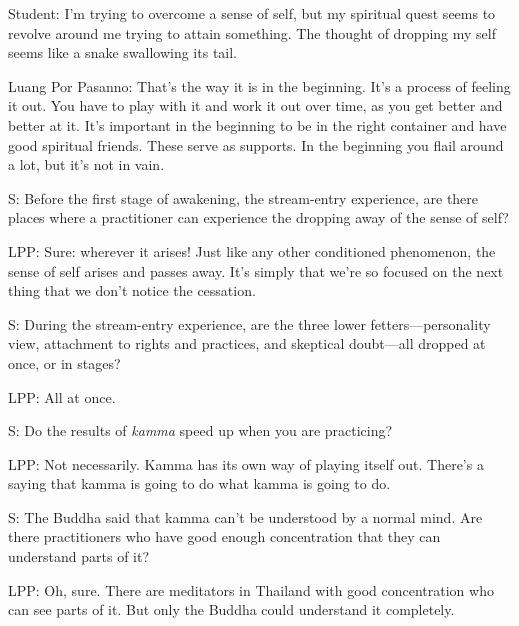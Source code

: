
Student: I'm trying to overcome a sense of self, but my spiritual quest 
seems to revolve around me trying to attain something. The thought of 
dropping my self seems like a snake swallowing its tail.

Luang Por Pasanno: That's the way it is in the beginning. It's a 
process of feeling it out. You have to play with it and work it out 
over time, as you get better and better at it. It's important in the 
beginning to be in the right container and have good spiritual friends. 
These serve as supports. In the beginning you flail around a lot, but 
it's not in vain.

S: Before the first stage of awakening, the stream-entry experience, 
are there places where a practitioner can experience the dropping away 
of the sense of self?

LPP: Sure: wherever it arises! Just like any other conditioned 
phenomenon, the sense of self arises and passes away. It's simply that 
we're so focused on the next thing that we don't notice the cessation.

S: During the stream-entry experience, are the three lower 
fetters---personality view, attachment to rights and practices, and 
skeptical doubt---all dropped at once, or in stages?

LPP: All at once.

S: Do the results of \emph{kamma} speed up when you are practicing?

LPP: Not necessarily. Kamma has its own way of playing itself out. 
There's a saying that kamma is going to do what kamma is going to do.

S: The Buddha said that kamma can't be understood by a normal mind. Are 
there practitioners who have good enough concentration that they can 
understand parts of it?

LPP: Oh, sure. There are meditators in Thailand with good concentration 
who can see parts of it. But only the Buddha could understand it 
completely.

